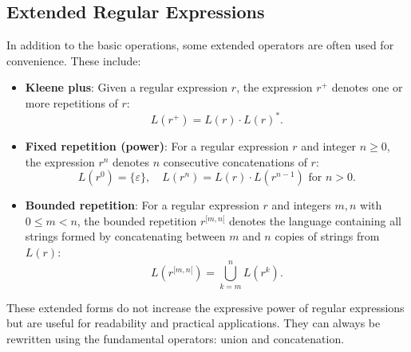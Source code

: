 




	
\subsection{Extended Regular Expressions}
\label{chap:prelim:extended_re}
In addition to the basic operations, some extended operators are often used for convenience. These include:

\begin{itemize}
    \item \textbf{Kleene plus}: Given a regular expression $r$, the expression $r^+$ denotes one or more repetitions of $r$:
    \[
    L(r^+) = L(r) \cdot L(r)^*.
    \]

    \item \textbf{Fixed repetition (power)}: For a regular expression $r$ and integer $n \geq 0$, the expression $r^n$ denotes $n$ consecutive concatenations of $r$:
    \[
    L(r^0) = \{ \varepsilon \}, \quad L(r^n) = L(r) \cdot L(r^{n-1}) \text{ for } n > 0.
    \]

	 \item \textbf{Bounded repetition}: For a regular expression $r$ and integers $m, n$ with $0 \leq m < n$, the bounded repetition $r^{[m,n[}$ denotes the language containing all strings formed by concatenating between $m$ and $n$ copies of strings from $L(r)$:
    \[
    L(r^{[m,n[}) = \bigcup_{k=m}^{n} L(r^k).
    \]
\end{itemize}

These extended forms do not increase the expressive power of regular expressions but are useful for readability and practical applications. They can always be rewritten using the fundamental operators: union and concatenation.


